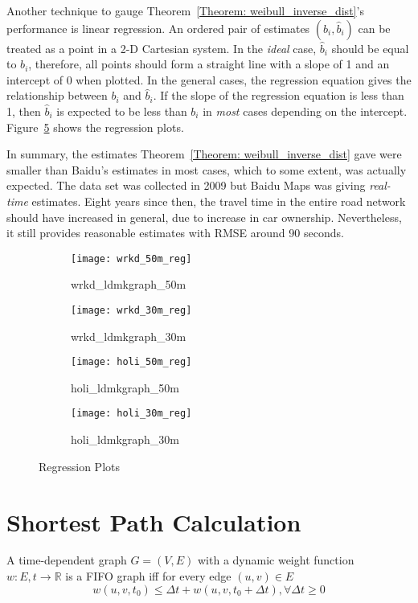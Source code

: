 Another technique to gauge Theorem~\ref{Theorem: weibull_inverse_dist}'s performance is linear regression. An ordered pair of estimates $(b_{i}, \hat{b}_{i})$ can be treated as a point in a 2-D Cartesian system. In the \emph{ideal} case, $\hat{b}_{i}$ should be equal to $b_{i}$, therefore, all points should form a straight line with a slope of 1 and an intercept of 0 when plotted. In the general cases, the regression equation gives the relationship between $b_{i}$ and $\hat{b}_{i}$. If the slope of the regression equation is less than 1, then $\hat{b}_{i}$ is expected to be less than $b_{i}$ in \emph{most} cases depending on the intercept. Figure~\ref{Fig:regression_plot} shows the regression plots. 

In summary, the estimates Theorem~\ref{Theorem: weibull_inverse_dist} gave were smaller than Baidu's estimates in most cases, which to some extent, was actually expected. The data set was collected in 2009 but Baidu Maps was giving \emph{real-time} estimates. Eight years since then, the travel time in the entire road network should have increased in general, due to increase in car ownership. Nevertheless, it still provides reasonable estimates with RMSE around 90 seconds. 

\begin{figure}[h!]
\begin{subfigure}{.5\textwidth}
\centering
\texttt{[image: wrkd\_50m\_reg]}
\caption{wrkd\_ldmkgraph\_50m}
\label{Fig:wrkd_50m_reg}
\end{subfigure}
\begin{subfigure}{.5\textwidth}
\centering
\texttt{[image: wrkd\_30m\_reg]}
\caption{wrkd\_ldmkgraph\_30m}
\label{Fig:wrkd_30m_reg}
\end{subfigure}

\begin{subfigure}{.5\textwidth}
\centering
\texttt{[image: holi\_50m\_reg]}
\caption{holi\_ldmkgraph\_50m}
\label{Fig:holi_50m_reg}
\end{subfigure}
\begin{subfigure}{.5\textwidth}
\centering
\texttt{[image: holi\_30m\_reg]}
\caption{holi\_ldmkgraph\_30m}
\label{Fig:holi_30m_reg}
\end{subfigure}

\caption{Regression Plots}
\label{Fig:regression_plot}
\end{figure}

\section{Shortest Path Calculation}
\begin{defn}\label{Def:fifo_graph}
A time-dependent graph $G=(V,E)$ with a dynamic weight function $w : E,t \rightarrow \mathbb{R}$ is a FIFO graph \cite{TDS08} iff for every edge $(u, v) \in E$
\begin{equation}
w(u, v, t_{0}) \leq \Delta t + w(u, v, t_{0} + \Delta t), \forall \Delta t \geq 0
\end{equation}
\end{defn}

